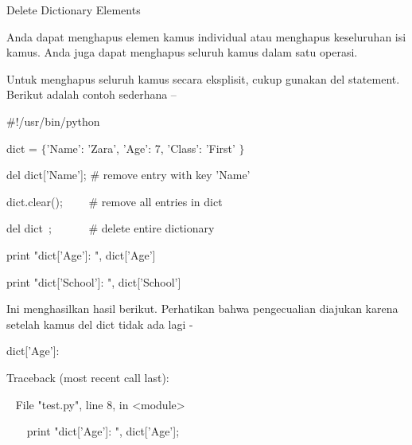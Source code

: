 \vspace{12pt}
\noindent 
Delete Dictionary Elements \par
\noindent 
Anda dapat menghapus elemen kamus individual atau menghapus keseluruhan isi kamus. Anda juga dapat menghapus seluruh kamus dalam satu operasi. \par
\noindent 
Untuk menghapus seluruh kamus secara eksplisit, cukup gunakan del statement. Berikut adalah contoh sederhana – \par
\vspace{12pt}
\noindent 
 \hspace*{0.5in}  $  \#  $!/usr/bin/python \par
\vspace{12pt}
\noindent 
 \hspace*{0.5in} dict =  $  \{  $'Name': 'Zara', 'Age': 7, 'Class': 'First' $  \}  $ \par
\vspace{12pt}
\noindent 
 \hspace*{0.5in} del dict['Name'];  $  \#  $ remove entry with key 'Name' \par
\noindent 
 \hspace*{0.5in} dict.clear();~~~~  $  \#  $ remove all entries in dict \par
\noindent 
 \hspace*{0.5in} del dict~;~~~~~~   $  \#  $ delete entire dictionary \par
\vspace{12pt}
\noindent 
 \hspace*{0.5in} print "dict['Age']: ", dict['Age'] \par
\noindent 
 \hspace*{0.5in} print "dict['School']: ", dict['School'] \par
\noindent 
Ini menghasilkan hasil berikut. Perhatikan bahwa pengecualian diajukan karena setelah kamus del dict tidak ada lagi - \par
\noindent 
 \hspace*{0.5in} dict['Age']: \par
\noindent 
 \hspace*{0.5in} Traceback (most recent call last): \par
\noindent 
~  \hspace*{0.5in} File "test.py", line 8, in <module> \par
\noindent 
~~~  \hspace*{0.5in}  \hspace*{0.5in} print "dict['Age']: ", dict['Age']; \par
